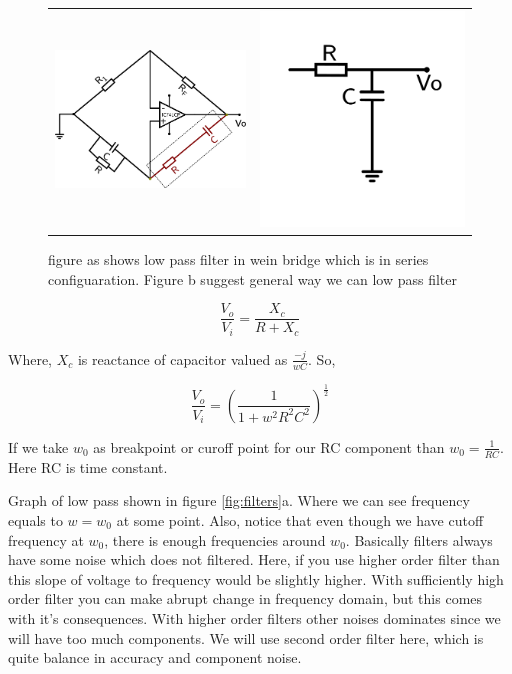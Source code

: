 \documentclass[14pt,a4paper]{extarticle}
\begin{document}
\begin{figure}[h]
\centering
\begin{tabular}{cc}
    \includegraphics[width=0.5\linewidth]{imgs/lowpassfilter1.png}&
    \includegraphics[width=0.3\linewidth]{imgs/highpassfilter2.png}
\end{tabular}
\caption{figure as shows low pass filter in wein bridge which is in series configuaration. Figure b suggest general way we can low pass filter}
\label{fig:lowpass}
\end{figure}

\begin{equation*}
\frac{V_o}{V_i}= \frac{X_c}{R+X_c}
\end{equation*}

Where, \(X_c\) is reactance of capacitor valued as \(\frac{-j}{wC}\). So,

\begin{equation*}
\frac{V_o}{V_i}=\left(\frac{1}{1+w^2R^2C^2}\right)^{\frac{1}{2}}
\end{equation*}

If we take \(w_0\) as breakpoint or curoff point for our RC component than \(w_0=\frac{1}{RC}\). Here RC is time constant. 

Graph of low pass shown in figure \ref{fig:filters}a. Where we can see frequency equals to \(w=w_0\) at some point. Also, notice that even though we have cutoff frequency at \(w_0\), there is enough frequencies around \(w_0\). Basically filters always have some noise which does not filtered. Here, if you use higher order filter than this slope of voltage to frequency would be slightly higher. With sufficiently high order filter you can make abrupt change in frequency domain, but this comes with it's consequences. With higher order filters other noises dominates since we will have too much components. We will use second order filter here, which is quite balance in accuracy and component noise.
\end{document}

